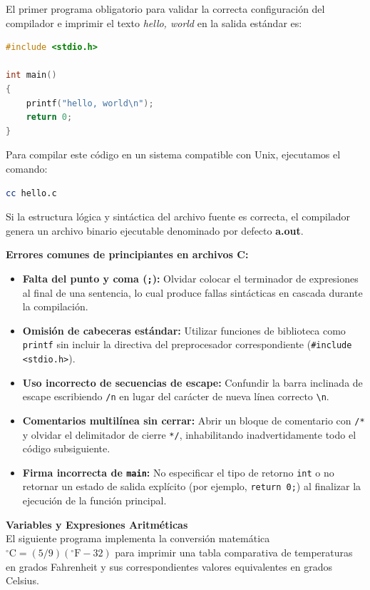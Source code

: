 \documentclass[11pt, a4paper]{article}
\begin{document}
El primer programa obligatorio para validar la correcta configuración del compilador e imprimir el texto \textit{hello, world} en la salida estándar es:

\begin{lstlisting}[language=C, caption={Hola mundo en C}, path={/Ejercicios/hello/hello.c}]
#include <stdio.h>

int main()
{
    printf("hello, world\n");
    return 0;
}
\end{lstlisting}

Para compilar este código en un sistema compatible con Unix, ejecutamos el comando:
\begin{lstlisting}[language=bash]
cc hello.c
\end{lstlisting}
Si la estructura lógica y sintáctica del archivo fuente es correcta, el compilador genera un archivo binario ejecutable denominado por defecto \textbf{a.out}.

\noindent\textbf{Errores comunes de principiantes en archivos C:}
\begin{itemize}
  \item \textbf{Falta del punto y coma (\texttt{;}):} Olvidar colocar el terminador de expresiones al final de una sentencia, lo cual produce fallas sintácticas en cascada durante la compilación.
  \item \textbf{Omisión de cabeceras estándar:} Utilizar funciones de biblioteca como \texttt{printf} sin incluir la directiva del preprocesador correspondiente (\texttt{\#include <stdio.h>}).
  \item \textbf{Uso incorrecto de secuencias de escape:} Confundir la barra inclinada de escape escribiendo \texttt{/n} en lugar del carácter de nueva línea correcto \texttt{\textbackslash n}.
  \item \textbf{Comentarios multilínea sin cerrar:} Abrir un bloque de comentario con \texttt{/*} y olvidar el delimitador de cierre \texttt{*/}, inhabilitando inadvertidamente todo el código subsiguiente.
  \item \textbf{Firma incorrecta de \texttt{main}:} No especificar el tipo de retorno \texttt{int} o no retornar un estado de salida explícito (por ejemplo, \texttt{return 0;}) al finalizar la ejecución de la función principal.
\end{itemize}

\noindent\textbf{Variables y Expresiones Aritméticas}\\[0.5em]
El siguiente programa implementa la conversión matemática $^{\circ}\text{C} = (5/9)(^{\circ}\text{F} - 32)$ para imprimir una tabla comparativa de temperaturas en grados Fahrenheit y sus correspondientes valores equivalentes en grados Celsius.
\end{document}
